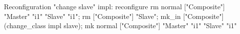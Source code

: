 Reconfiguration "change slave" impl:
	reconfigure 
		rm normal ["Composite"] "Master" "i1" "Slave" "i1";
		rm ["Composite"]  "Slave";
		mk_in ["Composite"] (change_class impl slave);
		mk normal ["Composite"] "Master" "i1" "Slave" "i1"